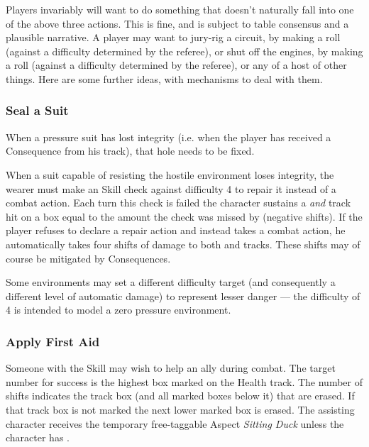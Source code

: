 Players invariably will want to do something that doesn't naturally fall into one of the above three actions. This is fine, and is subject to table consensus and a plausible narrative. A player may want to jury-rig a circuit, by making a  roll (against a difficulty determined by the referee), or shut off the engines, by making a  roll (against a difficulty determined by the referee), or any of a host of other things. Here are some further ideas, with mechanisms to deal with them.


\subsubsection{Seal a Suit}

When a pressure suit has lost integrity (i.e. when the player has received a Consequence from his \Health{} track), that hole needs to be fixed.

When a suit capable of resisting the hostile environment loses integrity, the wearer must make an  Skill check against difficulty 4 to repair it instead of a combat action. Each turn this check is failed the character sustains a \Composure{} \emph{and} \Health{} track hit on a box equal to the amount the check was missed by (negative shifts). If the player refuses to declare a repair action and instead takes a combat action, he automatically takes four shifts of damage to both \Composure{} and \Health{} tracks. These shifts may of course be mitigated by Consequences.

Some environments may set a different difficulty target (and consequently a different level of automatic damage) to represent lesser danger --- the difficulty of 4 is intended to model a zero pressure environment.


\subsubsection{Apply First Aid}

Someone with the  Skill may wish to help an ally during combat. The target number for success is the highest box marked on the Health track. The number of shifts indicates the track box (and all marked boxes below it) that are erased. If that track box is not marked the next lower marked box is erased. The assisting character receives the temporary free-taggable Aspect \emph{Sitting Duck} unless the character has .

